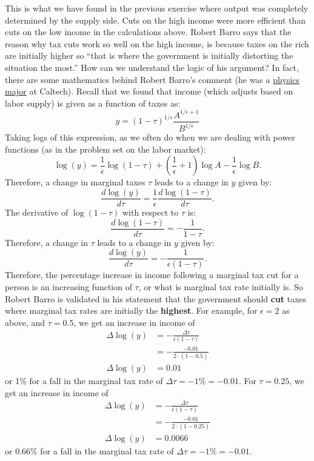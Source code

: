 \documentclass[]{book}
\begin{document}
This is what we have found in the previous exercise where output was
completely determined by the supply side. Cuts on the high income were
more efficient than cuts on the low income in the calculations above.
Robert Barro says that the reason why tax cuts work so well on the high
income, is because taxes on the rich are initially higher so ``that is
where the government is initially distorting the situation the most.''
How can we understand the logic of his argument? In fact, there are some
mathematics behind Robert Barro's comment (he was a
\href{https://scholar.harvard.edu/files/barro/files/vita_0518.pdf}{physics
major} at Caltech). Recall that we found that income (which adjusts
based on labor supply) is given as a function of taxes as:
\[y = (1-\tau)^{1/\epsilon}\frac{A^{1/\epsilon+1}}{B^{1/\epsilon}}\]
Taking logs of this expression, as we often do when we are dealing with
power functions (as in the problem set on the labor market):
\[\log(y) = \frac{1}{\epsilon}\log\left(1-\tau\right)+\left(\frac{1}{\epsilon}+1\right)\log A -\frac{1}{\epsilon} \log B.\]
Therefore, a change in marginal taxes \(\tau\) leads to a change in
\(y\) given by:
\[\frac{d\log(y)}{d\tau}=\frac{1}{\epsilon}\frac{d \log(1-\tau)}{d \tau}.\]
The derivative of \(\log(1-\tau)\) with respect to \(\tau\) is:
\[\frac{d \log(1-\tau)}{d \tau}=-\frac{1}{1-\tau}.\] Therefore, a change
in \(\tau\) leads to a change in \(y\) given by:
\[\boxed{\frac{d\log(y)}{d\tau}=-\frac{1}{\epsilon (1-\tau)}}.\]
Therefore, the percentage increase in income following a marginal tax
cut for a person is an increasing function of \(\tau\), or what is
marginal tax rate initially is. So Robert Barro is validated in his
statement that the government should \textbf{cut} taxes where marginal
tax rates are initially the \textbf{highest}. For example, for
\(\epsilon=2\) as above, and \(\tau=0.5\), we get an increase in income
of \[
\begin{aligned}
\Delta \log (y)&=-\frac{\Delta \tau}{\epsilon (1-\tau)}\\
&=-\frac{-0.01}{2 \cdot (1-0.5)}\\
\Delta \log (y)&=0.01
\end{aligned}
\] or 1\% for a fall in the marginal tax rate of
\(\Delta \tau = -1\% = -0.01\). For \(\tau=0.25\), we get an increase in
income of \[
\begin{aligned}
\Delta \log (y)&=-\frac{\Delta \tau}{\epsilon (1-\tau)}\\
&=-\frac{-0.01}{2 \cdot (1-0.25)}\\
\Delta \log (y)&=0.0066
\end{aligned}
\] or 0.66\% for a fall in the marginal tax rate of
\(\Delta \tau = -1\%= -0.01\).
\end{document}
